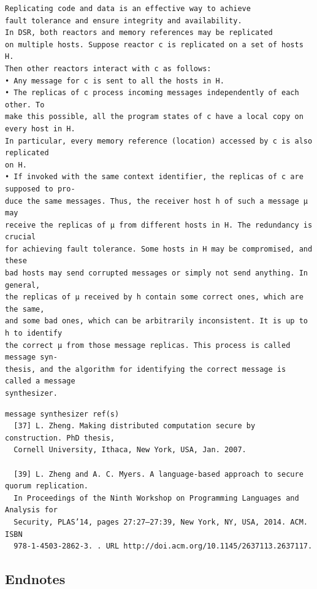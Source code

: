 \documentclass[dvipsnames]{article}
\theoremstyle{definition}
\begin{document}
\begin{theapx}
\begin{verbatim}
Replicating code and data is an effective way to achieve
fault tolerance and ensure integrity and availability.
In DSR, both reactors and memory references may be replicated
on multiple hosts. Suppose reactor c is replicated on a set of hosts H.
Then other reactors interact with c as follows:
• Any message for c is sent to all the hosts in H.
• The replicas of c process incoming messages independently of each other. To
make this possible, all the program states of c have a local copy on every host in H.
In particular, every memory reference (location) accessed by c is also replicated
on H.
• If invoked with the same context identifier, the replicas of c are supposed to pro-
duce the same messages. Thus, the receiver host h of such a message µ may
receive the replicas of µ from different hosts in H. The redundancy is crucial
for achieving fault tolerance. Some hosts in H may be compromised, and these
bad hosts may send corrupted messages or simply not send anything. In general,
the replicas of µ received by h contain some correct ones, which are the same,
and some bad ones, which can be arbitrarily inconsistent. It is up to h to identify
the correct µ from those message replicas. This process is called message syn-
thesis, and the algorithm for identifying the correct message is called a message
synthesizer.
\end{verbatim}

\begin{verbatim}
message synthesizer ref(s)
  [37] L. Zheng. Making distributed computation secure by construction. PhD thesis,
  Cornell University, Ithaca, New York, USA, Jan. 2007.

  [39] L. Zheng and A. C. Myers. A language-based approach to secure quorum replication.
  In Proceedings of the Ninth Workshop on Programming Languages and Analysis for
  Security, PLAS’14, pages 27:27–27:39, New York, NY, USA, 2014. ACM. ISBN
  978-1-4503-2862-3. . URL http://doi.acm.org/10.1145/2637113.2637117.
\end{verbatim}



  
\end{theapx}
\begin{theendnotes}

\section{Endnotes}
\printendnotes

\end{theendnotes}
\end{document}
